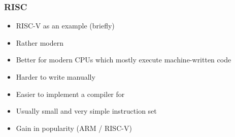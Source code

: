 \subsubsection{RISC}

\begin{itemize}
	\item RISC-V as an example (briefly)
	\item Rather modern
	\item Better for modern CPUs which mostly execute machine-written code
	\item Harder to write manually
	\item Easier to implement a compiler for
	\item Usually small and very simple instruction set
	\item Gain in popularity (ARM / RISC-V)
\end{itemize}
